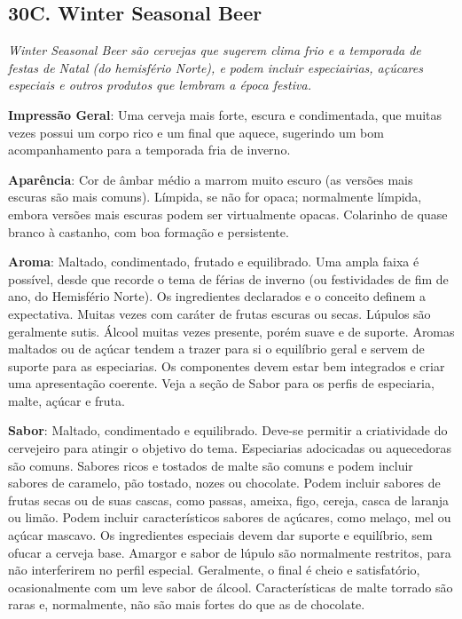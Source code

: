 \subsection*{30C. Winter Seasonal Beer}
\textit{Winter Seasonal Beer são cervejas que sugerem clima frio e a temporada de festas de Natal (do hemisfério Norte), e podem incluir especiairias, açúcares especiais e outros produtos que lembram a época festiva.}

\textbf{Impressão Geral}: Uma cerveja mais forte, escura e condimentada, que muitas vezes possui um corpo rico e um final que aquece, sugerindo um bom acompanhamento para a temporada fria de inverno.

\textbf{Aparência}: Cor de âmbar médio a marrom muito escuro (as versões mais escuras são mais comuns). Límpida, se não for opaca; normalmente límpida, embora versões mais escuras podem ser virtualmente opacas. Colarinho de quase branco à castanho, com boa formação e persistente.

\textbf{Aroma}: Maltado, condimentado, frutado e equilibrado. Uma ampla faixa é possível, desde que recorde o tema de férias de inverno (ou festividades de fim de ano, do Hemisfério Norte). Os ingredientes declarados e o conceito definem a expectativa. Muitas vezes com caráter de frutas escuras ou secas. Lúpulos são geralmente sutis. Álcool muitas vezes presente, porém suave e de suporte. Aromas maltados ou de açúcar tendem a trazer para si o equilíbrio geral e servem de suporte para as especiarias. Os componentes devem estar bem integrados e criar uma apresentação coerente. Veja a seção de Sabor para os perfis de especiaria, malte, açúcar e fruta.

\textbf{Sabor}: Maltado, condimentado e equilibrado. Deve-se permitir a criatividade do cervejeiro para atingir o objetivo do tema. Especiarias adocicadas ou aquecedoras são comuns. Sabores ricos e tostados de malte são comuns e podem incluir sabores de caramelo, pão tostado, nozes ou chocolate. Podem incluir sabores de frutas secas ou de suas cascas, como passas, ameixa, figo, cereja, casca de laranja ou limão. Podem incluir característicos sabores de açúcares, como melaço, mel ou açúcar mascavo. Os ingredientes especiais devem dar suporte e equilíbrio, sem ofucar a cerveja base. Amargor e sabor de lúpulo são normalmente restritos, para não interferirem no perfil especial. Geralmente, o final é cheio e satisfatório, ocasionalmente com um leve sabor de álcool. Características de malte torrado são raras e, normalmente, não são mais fortes do que as de chocolate.


